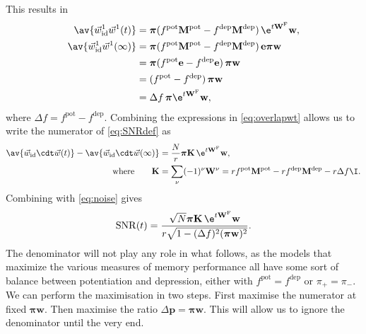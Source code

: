 \documentclass[12pt]{article}
\newcommand{\onev}{\mathbf{e}}
\newcommand{\prm}{p}
\newcommand{\pr}{\mathbf{\prm}}
\newcommand{\eqm}{\pi}
\newcommand{\eq}{\boldsymbol{\eqm}}
\newcommand{\wm}{w}
\newcommand{\w}{\mathbf{\wm}}
\newcommand{\Wm}{W}
\newcommand{\W}{\mathbf{\Wm}}
\newcommand{\MMdm}{M}
\newcommand{\MMd}{\mathbf{\MMdm}}
\newcommand{\encm}{K}
\newcommand{\enc}{\mathbf{\encm}}
\newcommand{\frg}{\W^{\mathrm{F}}}
\newcommand{\pot}{^{\text{pot}}}
\newcommand{\dep}{^{\text{dep}}}
\newcommand{\syn}{\vec{w}}
\newcommand{\synid}{\syn_\text{id}}
\DeclareMathOperator{\SNR}{SNR}
\begin{document}
This results in
%
\begin{equation}\label{eq:overlapwt}
\begin{aligned}
  \av{\synid^1 \syn^1(t)} &= \eq (f\pot \MMd \pot-f\dep \MMd \dep)\, \e^{t\frg} \w, \\
  \av{\synid^1 \syn^1(\infty)} &= \eq (f\pot \MMd \pot-f\dep \MMd \dep)\, \onev\eq \w \\
         &= \eq (f\pot\onev-f\dep\onev)\, \eq \w \\
         &=  (f\pot-f\dep)\, \eq \w \\
         &=  \Delta f\, \eq \e^{t\frg} \w ,
\end{aligned}
\end{equation}
%
where \(\Delta f = f\pot - f\dep \).
Combining the expressions in \cref{eq:overlapwt} allows us to write the numerator of \cref{eq:SNRdef} as
%
\begin{equation}\label{eq:signal}
\begin{aligned}
  \av{\synid \cdt \syn(t)} - \av{\synid \cdt \syn(\infty)}
    &= \frac{N}{r} \eq \enc \, \e^{t \frg} \w , \\
    \text{where} \qquad
  \enc &= \sum_\nu (-1)^\nu \W^\nu
    = r f\pot \MMd\pot - r f\dep \MMd\dep - r \Delta f \I.
\end{aligned}
\end{equation}
%
Combining with \eqref{eq:noise} gives
%
\begin{equation}\label{eq:SNRcurveExact}
  \SNR(t) = \frac{\sqrt{N} \eq \enc\,\e^{t \frg}\w}
                 {r \sqrt{1-(\Delta f)^2(\eq \w)^2}}.
\end{equation}
%
The denominator will not play any role in what follows, as the models that maximize the various measures of memory performance all have some sort of balance between potentiation and depression, either with \(f\pot=f\dep\) or \(\eqm_+=\eqm_-\).
We can perform the maximisation in two steps.
First maximise the numerator at fixed \(\eq \w\).
Then maximise the ratio \wrt \(\Delta \pr = \eq\w\).
This will allow us to ignore the denominator until the very end.
\end{document}
